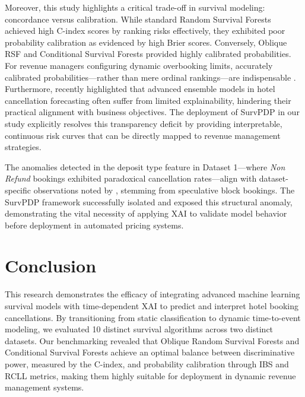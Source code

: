 \documentclass[pdflatex,sn-mathphys-ay]{sn-jnl}%
\theoremstyle{thmstyleone}%
\theoremstyle{thmstyletwo}%
\theoremstyle{thmstylethree}%
\begin{document}
Moreover, this study highlights a critical trade-off in survival modeling: concordance versus calibration. While standard Random Survival Forests achieved high C-index scores by ranking risks effectively, they exhibited poor probability calibration as evidenced by high Brier scores. Conversely, Oblique RSF and Conditional Survival Forests provided highly calibrated probabilities. For revenue managers configuring dynamic overbooking limits, accurately calibrated probabilities—rather than mere ordinal rankings—are indispensable \citep{ampountolas2025predicting}. Furthermore, \cite{liu2025explainable} recently highlighted that advanced ensemble models in hotel cancellation forecasting often suffer from limited explainability, hindering their practical alignment with business objectives. The deployment of SurvPDP in our study explicitly resolves this transparency deficit by providing interpretable, continuous risk curves that can be directly mapped to revenue management strategies.

The anomalies detected in the deposit type feature in Dataset 1—where \textit{Non Refund} bookings exhibited paradoxical cancellation rates—align with dataset-specific observations noted by \cite{antonio2019big}, stemming from speculative block bookings. The SurvPDP framework successfully isolated and exposed this structural anomaly, demonstrating the vital necessity of applying XAI to validate model behavior before deployment in automated pricing systems.

\section{Conclusion} %
\label{sec:conclusion}

This research demonstrates the efficacy of integrating advanced machine learning survival models with time-dependent XAI to predict and interpret hotel booking cancellations. By transitioning from static classification to dynamic time-to-event modeling, we evaluated 10 distinct survival algorithms across two distinct datasets. Our benchmarking revealed that Oblique Random Survival Forests and Conditional Survival Forests achieve an optimal balance between discriminative power, measured by the C-index, and probability calibration through IBS and RCLL metrics, making them highly suitable for deployment in dynamic revenue management systems.
\end{document}
